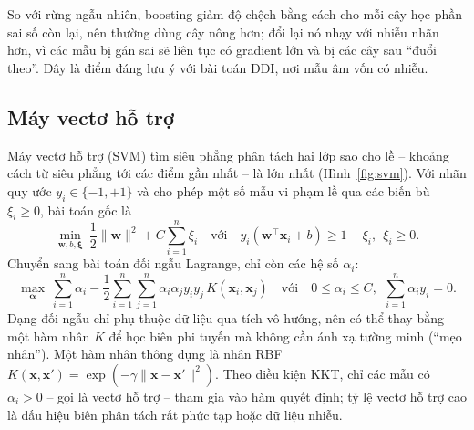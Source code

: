\documentclass[12pt,a4paper,oneside]{report}
\begin{document}
So với rừng ngẫu nhiên, boosting giảm độ chệch bằng cách cho mỗi cây học
phần sai số còn lại, nên thường dùng cây nông hơn; đổi lại nó nhạy với nhiễu
nhãn hơn, vì các mẫu bị gán sai sẽ liên tục có gradient lớn và bị các cây sau
``đuổi theo''. Đây là điểm đáng lưu ý với bài toán DDI, nơi mẫu âm vốn có nhiễu.

\subsection{Máy vectơ hỗ trợ}
Máy vectơ hỗ trợ (SVM) \cite{cortes1995} tìm siêu phẳng phân tách hai lớp sao
cho lề -- khoảng cách từ siêu phẳng tới các điểm gần nhất -- là lớn nhất
(Hình~\ref{fig:svm}). Với nhãn quy ước $y_i \in \{-1, +1\}$ và cho phép một số
mẫu vi phạm lề qua các biến bù $\xi_i \ge 0$, bài toán gốc là
\begin{equation}
  \min_{\mathbf{w}, b, \boldsymbol{\xi}}\ \frac{1}{2}\lVert \mathbf{w}\rVert^{2}
  + C \sum_{i=1}^{n} \xi_i
  \quad \text{với}\quad
  y_i(\mathbf{w}^{\top}\mathbf{x}_i + b) \ge 1 - \xi_i,\ \ \xi_i \ge 0 .
  \label{eq:svmprimal}
\end{equation}
Chuyển sang bài toán đối ngẫu Lagrange, chỉ còn các hệ số $\alpha_i$:
\begin{equation}
  \max_{\boldsymbol{\alpha}}\ \sum_{i=1}^{n}\alpha_i
  - \frac{1}{2}\sum_{i=1}^{n}\sum_{j=1}^{n}
  \alpha_i \alpha_j y_i y_j\, K(\mathbf{x}_i, \mathbf{x}_j)
  \quad \text{với}\quad
  0 \le \alpha_i \le C,\ \ \sum_{i=1}^{n} \alpha_i y_i = 0 .
  \label{eq:svmdual}
\end{equation}
Dạng đối ngẫu chỉ phụ thuộc dữ liệu qua tích vô hướng, nên có thể thay
bằng một hàm nhân $K$ để học biên phi tuyến mà không cần ánh xạ tường minh
(``mẹo nhân''). Một hàm nhân thông dụng là nhân RBF
$K(\mathbf{x}, \mathbf{x}') = \exp(-\gamma \lVert \mathbf{x} - \mathbf{x}'\rVert^{2})$.
Theo điều kiện KKT, chỉ các mẫu có $\alpha_i > 0$ -- gọi là vectơ hỗ trợ --
tham gia vào hàm quyết định; tỷ lệ vectơ hỗ trợ cao là dấu hiệu biên phân tách
rất phức tạp hoặc dữ liệu nhiễu.
\end{document}

